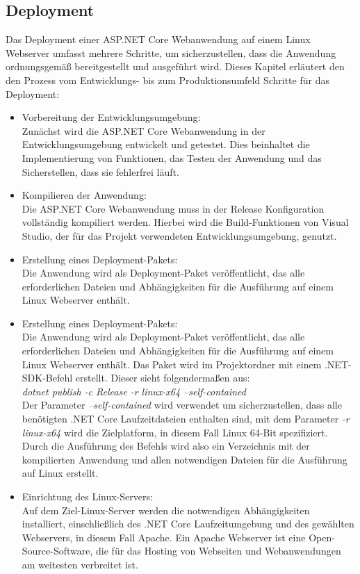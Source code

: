 \documentclass[conference]{IEEEtran}
\begin{document}
\subsection{Deployment}
Das Deployment einer ASP.NET Core Webanwendung auf einem Linux Webserver umfasst mehrere Schritte, um sicherzustellen, dass die Anwendung ordnungsgemäß bereitgestellt und ausgeführt wird. Dieses Kapitel erläutert den den Prozess vom Entwicklungs- bis zum Produktionsumfeld
Schritte für das Deployment:
\begin{itemize}
	\item Vorbereitung der Entwicklungsumgebung: \\
	Zunächst wird die ASP.NET Core Webanwendung in der Entwicklungsumgebung entwickelt und getestet. Dies beinhaltet die Implementierung von Funktionen, das Testen der Anwendung und das Sicherstellen, dass sie fehlerfrei läuft.
	\item Kompilieren der Anwendung: \\
	Die ASP.NET Core Webanwendung muss in der Release Konfiguration vollständig kompiliert werden. Hierbei wird die Build-Funktionen von Visual Studio, der für das Projekt verwendeten Entwicklungsumgebung, genutzt.
	\item Erstellung eines Deployment-Pakets: \\
	Die Anwendung wird als Deployment-Paket veröffentlicht, das alle erforderlichen Dateien und Abhängigkeiten für die Ausführung auf einem Linux Webserver enthält.
	\item Erstellung eines Deployment-Pakets: \\
	Die Anwendung wird als Deployment-Paket veröffentlicht, das alle erforderlichen Dateien und Abhängigkeiten für die Ausführung auf einem Linux Webserver enthält. Das Paket wird im Projektordner mit einem .NET-SDK-Befehl erstellt. Dieser sieht folgendermaßen aus:\\
	\textit{dotnet publish -c Release -r linux-x64 --self-contained} \\
	Der Parameter \textit{--self-contained} wird verwendet um sicherzustellen, dass alle benötigten .NET Core Laufzeitdateien enthalten sind, mit dem Parameter \textit{-r linux-x64} wird die Zielplatform, in diesem Fall Linux 64-Bit spezifiziert. Durch die Ausführung des Befehls wird also ein Verzeichnis mit der kompilierten Anwendung und allen notwendigen Dateien für die Ausführung auf Linux erstellt.
	\item Einrichtung des Linux-Servers: \\
	Auf dem Ziel-Linux-Server werden die notwendigen Abhängigkeiten installiert, einschließlich des .NET Core Laufzeitumgebung und des gewählten Webservers, in diesem Fall Apache. Ein Apache Webserver ist eine Open-Source-Software, die für das Hosting von Webseiten und Webanwendungen am weitesten verbreitet ist. 

\end{itemize}
\end{document}
